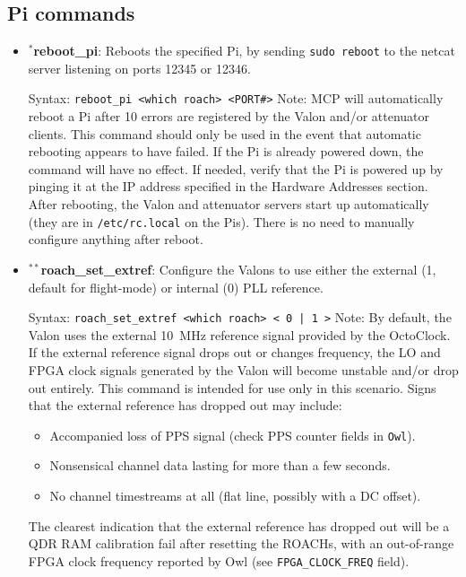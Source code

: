 \subsection{Pi commands}
\begin{itemize}[leftmargin=*,label={}]

\item $^{*}$\textbf{reboot\_pi}: Reboots the specified Pi, by sending \texttt{sudo reboot} to the netcat server listening on ports 12345 or 12346.

Syntax: \texttt{reboot\_pi <which roach> <PORT\#>}
Note: MCP will automatically reboot a Pi after 10 errors are registered by the Valon and/or attenuator clients. This command should only be used in the event that automatic rebooting appears to have failed. If the Pi is already powered down, the command will have no effect. If needed, verify that the Pi is powered up by pinging it at the IP address specified in the Hardware Addresses section. After rebooting, the Valon and attenuator servers start up automatically (they are in \texttt{/etc/rc.local} on the Pis). There is no need to manually configure anything after reboot.

\item $^{**}$\textbf{roach\_set\_extref}: Configure the Valons to use either the external (1, default for flight-mode) or internal (0) PLL reference.

Syntax: \texttt{roach\_set\_extref <which roach> < 0 | 1 >}
Note: By default, the Valon uses the external 10~MHz reference signal provided by the OctoClock. If the external reference signal drops out or changes frequency, the LO and FPGA clock signals generated by the Valon will become unstable and/or drop out entirely. This command is intended for use only in this scenario. Signs that the external reference has dropped out may include:
\begin{itemize}
  \item Accompanied loss of PPS signal (check PPS counter fields in \texttt{Owl}).
  \item Nonsensical channel data lasting for more than a few seconds.
  \item No channel timestreams at all (flat line, possibly with a DC offset).
\end{itemize}
The clearest indication that the external reference has dropped out will be a QDR RAM calibration fail after resetting the ROACHs, with an out-of-range FPGA clock frequency reported by Owl (see \texttt{FPGA\_CLOCK\_FREQ} field).


\end{itemize}
